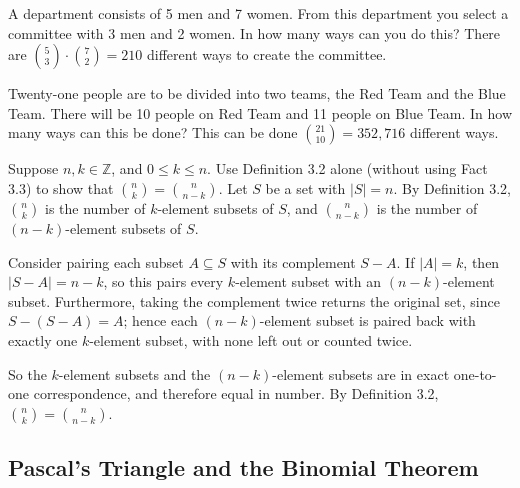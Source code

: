 \documentclass[DIN, pagenumber=false, fontsize=11pt, parskip=half]{scrartcl}
\begin{document}
\begin{problems}
    \problem A department consists of 5 men and 7 women. From this department you select a committee with 3 men and 2 women. In how many ways can you do this?
    \answer There are ${5 \choose 3} \cdot {7 \choose 2} = 210$ different ways to create the committee.

    \problem Twenty-one people are to be divided into two teams, the Red Team and the Blue Team. There will be 10 people on Red Team and 11 people on Blue Team. In how many ways can this be done?
    \answer This can be done ${21 \choose 10} = 352,716$ different ways.

    \problem Suppose $n,k \in \mathbb{Z}$, and $0 \leq k \leq n$. Use Definition 3.2 alone (without using Fact 3.3) to show that ${n \choose k}  = {n \choose n-k}$.
    \answer Let $S$ be a set with $|S| = n$. By Definition 3.2, ${n \choose k}$ is the number of $k$-element subsets of $S$, and ${n \choose n-k}$ is the number of $(n-k)$-element subsets of $S$.

    Consider pairing each subset $A \subseteq S$ with its complement $S - A$. If $|A| = k$, then $|S - A| = n - k$, so this pairs every $k$-element subset with an $(n-k)$-element subset. Furthermore, taking the complement twice returns the original set, since $S - (S - A) = A$; hence each $(n-k)$-element subset is paired back with exactly one $k$-element subset, with none left out or counted twice.

    So the $k$-element subsets and the $(n-k)$-element subsets are in exact one-to-one correspondence, and therefore equal in number. By Definition 3.2, $\binom{n}{k} = \binom{n}{n-k}$.
\end{problems}

\subsection{Pascal's Triangle and the Binomial Theorem}
\end{document}
